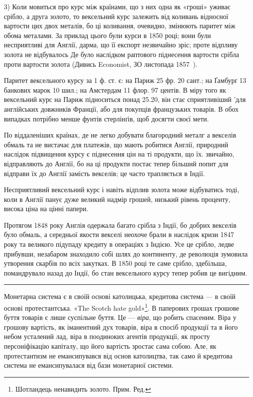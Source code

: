 
3) Коли мовиться про курс між країнами, що з них одна як «гроші»
уживає срібло, а друга золото, то вексельний курс залежить від коливань відносної
вартости цих двох металів, бо ці коливання, очевидно, змінюють паритет
між обома металами. За приклад цього були курси в 1850 році; вони були
несприятливі для Англії, дарма, що її експорт незвичайно зріс; проте відпливу
золота не відбувалось Де було наслідком раптового піднесення вартости срібла
проти вартости золота (Дивись Economist, ЗО листопада 1857~).

Паритет вексельного курсу за 1 ф. ст. є: на Париж 25 фр. 20 сант.; на
Ґамбурґ 13 банкових марок 10  шил.; на Амстердам 11 флор. 97 центів.
В міру того як вексельний курс на Париж підноситься понад 25.20, він стає
сприятливіший 'для англійських довжників Франції, або для покупців французьких
товарів. В обох випадках потрібно менше фунтів стерлінґів, щоб досягти
своєї мети.

По віддаленіших країнах, де не легко добувати благородний металг
а векселів обмаль та не вистачає для платежів, що мають робитися Англії,
природний наслідок підвищення курсу є піднесення цін на ті продукти, що їх.
звичайно, відправляють до Англії, бо на ці продукти постає тепер більший попит
для відправи їх до Англії замість векселів; це часто трапляється в Індії.

Несприятливий вексельний курс і навіть відплив золота може відбуватись
тоді, коли в Англії панує дуже великий надмір грошей, низький рівень проценту,
висока ціна на цінні папери.

Протягом 1848 року Англія одержала багато срібла з Індії, бо добрих
векселів було обмаль, а середньої якости векселі неохоче брали в наслідок
кризи 1847 року та великого підупаду кредиту в операціях з Індією. Усе це
срібло, ледве прибувши, незабаром знаходило собі шлях до континенту, де революція
зумовила утворення скарбів по всіх закутках. В 1850 році те саме
срібло, здебільша, помандрувало назад до Індії, бо стан вексельного курсу тепер
робив це вигідним.

\pfbreak

Монетарна система є в своїй основі католицька, кредитова система — в своїй
основі протестантська. «The Scotch hate gold»\footnote*{
Шотландець ненавидить золото. Прим. Ред.
}. В паперових грошах грошове
буття товарів є лише суспільне буття. Це — \emph{віра}, що робить спасеним. Віра
у грошову вартість, як іманентний дух товарів, віра в спосіб продукції та в його
небом усталений лад, віра в поодиноких агентів продукції, як просту персоніфікацію
капіталу, що його вартість зростає сама собою. Але, як протестантизм
не емансипувався від основ католицтва, так само й кредитова система не емансипувалася
від бази монетарної системи.


